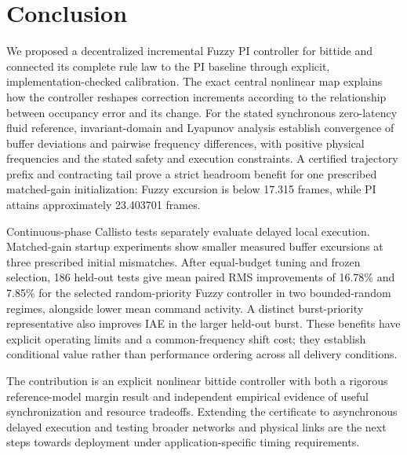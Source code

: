 \section{Conclusion}
\label{sec:conclusion}

We proposed a decentralized incremental Fuzzy PI controller for
bittide and connected its complete rule law to the PI baseline through
explicit, implementation-checked calibration. The exact central
nonlinear map explains how the controller reshapes correction
increments according to the relationship between occupancy error
and its change. For the stated synchronous zero-latency fluid reference,
invariant-domain and Lyapunov analysis establish convergence of buffer
deviations and pairwise frequency differences, with positive physical
frequencies and the stated safety and execution constraints. A certified
trajectory prefix and contracting tail prove a strict headroom benefit
for one prescribed matched-gain initialization: Fuzzy excursion is
below 17.315 frames, while PI attains approximately 23.403701 frames.

Continuous-phase Callisto tests separately evaluate delayed local
execution. Matched-gain startup experiments show smaller measured
buffer excursions at three prescribed initial mismatches. After
equal-budget tuning and frozen selection, 186 held-out tests give
mean paired RMS improvements of 16.78\% and 7.85\% for the selected
random-priority Fuzzy controller in two bounded-random regimes,
alongside lower mean command activity. A distinct burst-priority
representative also improves IAE in the larger held-out burst.
These benefits have explicit operating limits and a common-frequency
shift cost; they establish conditional value rather than performance
ordering across all delivery conditions.

The contribution is an explicit nonlinear bittide controller with
both a rigorous reference-model margin result and independent
empirical evidence of useful synchronization and resource tradeoffs.
Extending the certificate to asynchronous delayed execution and
testing broader networks and physical links are the next steps
towards deployment under application-specific timing requirements.


